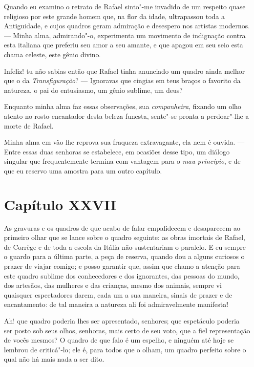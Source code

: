 Quando eu examino o retrato de Rafael sinto"-me invadido de um respeito
quase religioso por este grande homem que, na flor da idade,
ultrapassou toda a Antiguidade, e cujos quadros geram admiração e
desespero nos artistas modernos. --- Minha alma, admirando"-o,
experimenta um movimento de indignação contra esta italiana que
preferiu seu amor a seu amante, e que apagou em seu seio esta chama
celeste, este gênio divino.

 Infeliz! tu não sabias então que Rafael tinha anunciado um quadro ainda
melhor que o da \textit{Transfiguração}? --- Ignoravas que cingias em
teus braços o favorito da natureza, o pai do entusiasmo, um gênio
sublime, um deus?

 Enquanto minha alma faz essas observações, sua \textit{companheira},
fixando um olho atento no rosto encantador desta beleza funesta,
sente"-se pronta a perdoar"-lhe a morte de Rafael.

 Minha alma em vão lhe reprova sua fraqueza extravagante, ela nem é
ouvida. --- Entre essas duas senhoras se estabelece, em ocasiões desse
tipo, um diálogo singular que frequentemente termina com vantagem para
o \textit{mau princípio}, e de que eu reservo uma amostra para um outro
capítulo.

\section*{Capítulo XXVII}

 As gravuras e os quadros de que acabo de falar empalidecem e
desaparecem ao primeiro olhar que se lance sobre o quadro seguinte: as
obras imortais de Rafael, de Corrège e de toda a escola da Itália não
sustentariam o paralelo. E eu sempre o guardo para a última parte, a
peça de reserva, quando dou a alguns curiosos o prazer de viajar
comigo; e posso garantir que, assim que chamo a atenção para este
quadro sublime dos conhecedores e dos ignorantes, das pessoas do mundo,
dos artesãos, das mulheres e das crianças, mesmo dos animais, sempre vi
quaisquer espectadores darem, cada um a sua maneira, sinais de prazer e
de encantamento: de tal maneira a natureza ali foi admiravelmente
manifesta!

 Ah! que quadro poderia lhes ser apresentado, senhores; que espetáculo
poderia ser posto sob seus olhos, senhoras, mais certo de seu voto, que
a fiel representação de vocês mesmos? O quadro de que falo é um
espelho, e ninguém até hoje se lembrou de criticá"-lo; ele é, para todos
que o olham, um quadro perfeito sobre o qual não há mais nada a ser
dito.

